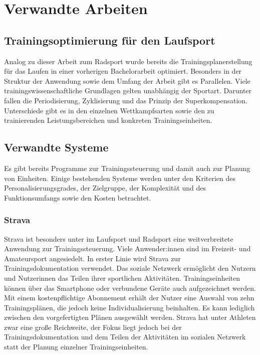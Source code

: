 \chapter{Verwandte Arbeiten}
\label{sec:verwandt}

\section{Trainingsoptimierung für den Laufsport}
\label{sec:verwandt:sec1}
Analog zu dieser Arbeit zum Radsport wurde bereits die Trainingsplanerstellung für das Laufen in einer vorherigen Bachelorarbeit optimiert. Besonders in der Struktur der Anwendung sowie dem Umfang der Arbeit gibt es Parallelen. Viele trainingswissenschaftliche Grundlagen gelten unabhängig der Sportart. Darunter fallen die Periodisierung, Zyklisierung und das Prinzip der Superkompensation. Unterschiede gibt es in den einzelnen Wettkampfsarten sowie den zu trainierenden Leistungsbereichen und konkreten Trainingseinheiten.

\section{Verwandte Systeme}
Es gibt bereits Programme zur Trainingssteuerung und damit auch zur Planung von Einheiten. Einige bestehenden Systeme werden unter den Kriterien des Personalisierungsgrades, der Zielgruppe, der Komplexität und des Funktionsumfangs sowie den Kosten betrachtet.

\subsection{Strava}
Strava \cite{StravaWeb} ist besonders unter im Laufsport und Radsport eine weitverbreitete Anwendung zur Trainingssteuerung. Viele Anwender:innen sind im Freizeit- und Amateursport angesiedelt. In erster Linie wird Strava zur Trainingsdokumentation verwendet. Das soziale Netzwerk ermöglicht den Nutzern und Nutzerinnen das Teilen ihrer sportlichen Aktivitäten. Trainingseinheiten können über das Smartphone oder verbundene Geräte auch aufgezeichnet werden. Mit einem kostenpflichtige Abonnement erhält der Nutzer eine Auswahl von zehn Trainingsplänen, die jedoch keine Individualisierung beinhalten. Es kann lediglich zwischen den vorgefertigten Plänen ausgewählt werden. Strava hat unter Athleten zwar eine große Reichweite, der Fokus liegt jedoch bei der Trainingsdokumentation und dem Teilen der Aktivitäten im sozialen Netzwerk statt der Planung einzelner Trainingseinheiten.

